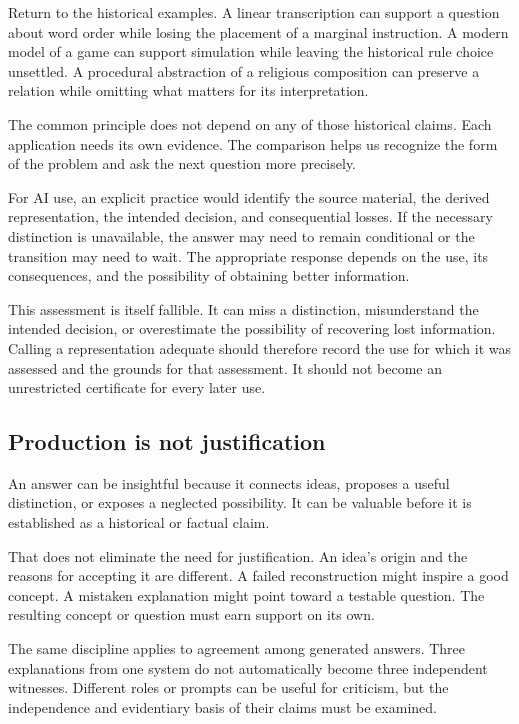 \documentclass[11pt]{article}
\begin{document}
Return to the historical examples. A linear transcription can support a
question about word order while losing the placement of a marginal instruction.
A modern model of a game can support simulation while leaving the historical
rule choice unsettled. A procedural abstraction of a religious composition
can preserve a relation while omitting what matters for its interpretation.

The common principle does not depend on any of those historical claims.
Each application needs its own evidence. The comparison helps us recognize
the form of the problem and ask the next question more precisely.

For AI use, an explicit practice would identify the source material, the
derived representation, the intended decision, and consequential losses.
If the necessary distinction is unavailable, the answer may need to remain
conditional or the transition may need to wait. The appropriate response
depends on the use, its consequences, and the possibility of obtaining
better information.

This assessment is itself fallible. It can miss a distinction, misunderstand
the intended decision, or overestimate the possibility of recovering lost
information. Calling a representation adequate should therefore record
the use for which it was assessed and the grounds for that assessment.
It should not become an unrestricted certificate for every later use.

\subsection{Production is not justification}

An answer can be insightful because it connects ideas, proposes a useful
distinction, or exposes a neglected possibility. It can be valuable before
it is established as a historical or factual claim.

That does not eliminate the need for justification. An idea's origin and
the reasons for accepting it are different. A failed reconstruction might
inspire a good concept. A mistaken explanation might point toward a testable
question. The resulting concept or question must earn support on its own.

The same discipline applies to agreement among generated answers.
Three explanations from one system do not automatically become three
independent witnesses. Different roles or prompts can be useful for criticism,
but the independence and evidentiary basis of their claims must be examined.
\end{document}
